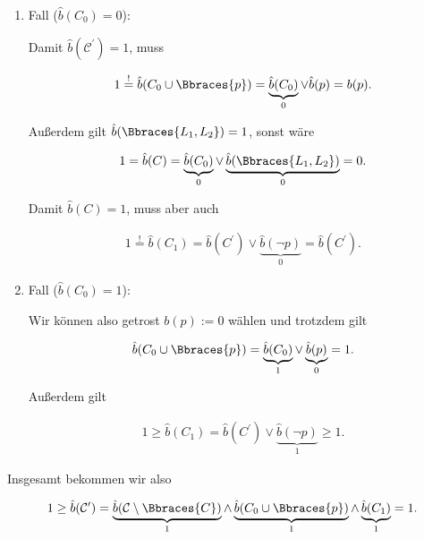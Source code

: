 \begin{solution}
\begin{enumerate}[label = \arabic*.]

    \item Fall ($\hat b(C_0) = 0$):
    
    Damit $\hat b(\mathcal C^\prime) = 1$, muss

    \begin{align*}
        1
        \stackrel{!}{=}
        \hat b(C_0 \cup \Bbraces{p})
        =
        \underbrace{\hat b(C_0)}_0
        \lor
        \hat b(p)
        =
        b(p).
    \end{align*}

    Außerdem gilt $\hat b(\Bbraces{L_1, L_2}) = 1$, sonst wäre

    \begin{align*}
        1
        =
        \hat b(C)
        =
        \underbrace{\hat b(C_0)}_0
        \lor
        \underbrace{\hat b(\Bbraces{L_1, L_2})}_0
        =
        0.
    \end{align*}

    Damit $\hat b(C) = 1$, muss aber auch

    \begin{align*}
        1
        \stackrel{!}{=}
        \hat b(C_1)
        =
        \hat b(C^\prime)
        \lor
        \underbrace{\hat b(\neg p)}_0
        =
        \hat b(C^\prime).
    \end{align*}

    \item Fall ($\hat b(C_0) = 1$):
    
    Wir können also getrost $b(p) := 0$ wählen und trotzdem gilt

    \begin{align*}
        \hat b(C_0 \cup \Bbraces{p})
        =
        \underbrace{\hat b(C_0)}_1
        \lor
        \underbrace{\hat b(p)}_0
        =
        1.
    \end{align*}

    Außerdem gilt

    \begin{align*}
        1
        \geq
        \hat b(C_1)
        =
        \hat b(C^\prime)
        \lor
        \underbrace{\hat b(\neg p)}_1
        \geq
        1.
    \end{align*}

\end{enumerate}

Insgesamt bekommen wir also

\begin{align*}
    1
    \geq
    \hat b(\mathcal C^\prime)
    =
    \underbrace{\hat b(\mathcal C \setminus \Bbraces{C})}_1
    \land
    \underbrace{\hat b(C_0 \cup \Bbraces{p})}_1
    \land
    \underbrace{\hat b(C_1)}_1
    =
    1.
\end{align*}


\end{solution}
